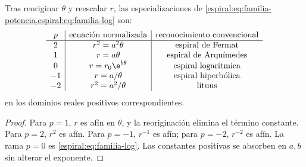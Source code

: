 \begin{theorem}
Tras reoriginar \(\theta\) y reescalar \(r\), las especializaciones de
\cref{espiral:eq:familia-potencia,espiral:eq:familia-log} son:
\[
\begin{array}{c|c|c}
p&\text{ecuación normalizada}&\text{reconocimiento convencional}\\ \hline
2&r^2=a^2\theta&\text{espiral de Fermat}\\
1&r=a\theta&\text{espiral de Arquímedes}\\
0&r=r_0\e^{b\theta}&\text{espiral logarítmica}\\
-1&r=a/\theta&\text{espiral hiperbólica}\\
-2&r^2=a^2/\theta&\text{lituus}
\end{array}
\]
en los dominios reales positivos correspondientes.
\end{theorem}
\begin{proof}
Para \(p=1\), \(r\) es afín en \(\theta\), y la reoriginación elimina el
término constante. Para \(p=2\), \(r^2\) es afín. Para \(p=-1\),
\(r^{-1}\) es afín; para \(p=-2\), \(r^{-2}\) es afín. La rama \(p=0\)
es \cref{espiral:eq:familia-log}. Las constantes positivas se absorben en \(a,b\)
sin alterar el exponente.
\end{proof}

